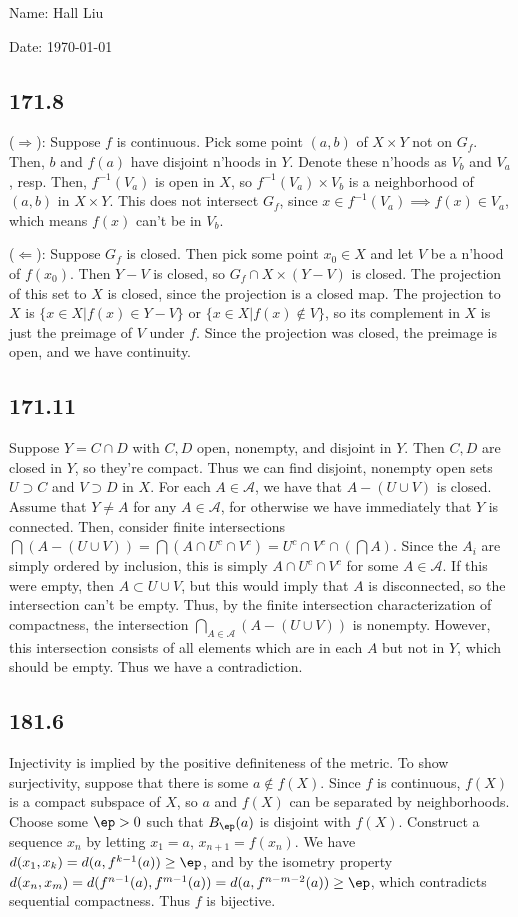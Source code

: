 \documentclass{article}
\begin{document}
Name: Hall Liu

Date: \today 
\vspace{1.5cm}
\subsection*{171.8}
($\Rightarrow$): Suppose $f$ is continuous. Pick some point $(a,b)$ of $X\times Y$ not on $G_f$. Then, $b$ and $f(a)$ have disjoint n'hoods in $Y$. Denote these n'hoods as $V_b$ and $V_a$, resp. Then, $f^{-1}(V_a)$ is open in $X$, so $f^{-1}(V_a)\times V_b$ is a neighborhood of $(a,b)$ in $X\times Y$. This does not intersect $G_f$, since $x\in f^{-1}(V_a)\implies f(x)\in V_a$, which means $f(x)$ can't be in $V_b$.

($\Leftarrow$): Suppose $G_f$ is closed. Then pick some point $x_0\in X$ and let $V$ be a n'hood of $f(x_0)$. Then $Y-V$ is closed, so $G_f\cap X\times(Y-V)$ is closed. The projection of this set to $X$ is closed, since the projection is a closed map. The projection to $X$ is $\{x\in X|f(x)\in Y-V\}$ or $\{x\in X|f(x)\not\in V\}$, so its complement in $X$ is just the preimage of $V$ under $f$. Since the projection was closed, the preimage is open, and we have continuity.
\subsection*{171.11}
Suppose $Y=C\cap D$ with $C,D$ open, nonempty, and disjoint in $Y$. Then $C,D$ are closed in $Y$, so they're compact. Thus we can find disjoint, nonempty open sets $U\supset C$ and $V\supset D$ in $X$. For each $A\in\mathscr{A}$, we have that $A-(U\cup V)$ is closed. Assume that $Y\neq A$ for any $A\in\mathscr{A}$, for otherwise we have immediately that $Y$ is connected. Then, consider finite intersections $\bigcap (A-(U\cup V))=\bigcap(A\cap U^c\cap V^c)=U^c\cap V^c\cap\left(\bigcap A\right)$. Since the $A_i$ are simply ordered by inclusion, this is simply $A\cap U^c\cap V^c$ for some $A\in\mathscr{A}$. If this were empty, then $A\subset U\cup V$, but this would imply that $A$ is disconnected, so the intersection can't be empty. Thus, by the finite intersection characterization of compactness, the intersection $\bigcap_{A\in\mathscr{A}}(A-(U\cup V))$ is nonempty. However, this intersection consists of all elements which are in each $A$ but not in $Y$, which should be empty. Thus we have a contradiction.
\subsection*{181.6}
Injectivity is implied by the positive definiteness of the metric. To show surjectivity, suppose that there is some $a\not\in f(X)$. Since $f$ is continuous, $f(X)$ is a compact subspace of $X$, so $a$ and $f(X)$ can be separated by neighborhoods. Choose some $\ep>0$ such that $B_\ep(a)$ is disjoint with $f(X)$. Construct a sequence $x_n$ by letting $x_1=a$, $x_{n+1}=f(x_n)$. We have $d(x_1,x_k)=d(a,f^{k-1}(a))\geq\ep$, and by the isometry property $d(x_n,x_m)=d(f^{n-1}(a),f^{m-1}(a))=d(a,f^{n-m-2}(a))\geq\ep$, which contradicts sequential compactness. Thus $f$ is bijective.
\end{document}
